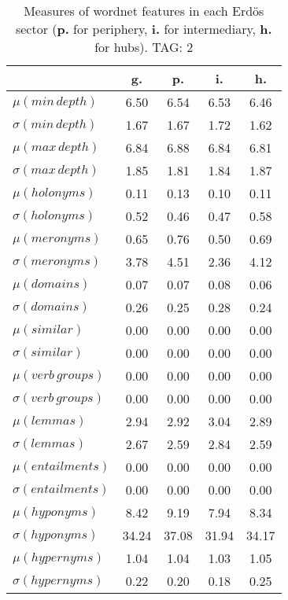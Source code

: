 \begin{table}[h!]
\begin{center}
\begin{tabular}{| l || c | c | c | c |}\hline
 & {\bf g.} & {\bf p.} & {\bf i.} & {\bf h.} \\\hline\hline
$\mu(min\,depth)$ & 6.50  & 6.54  & 6.53  & 6.46 \\
$\sigma(min\,depth)$ & 1.67  & 1.67  & 1.72  & 1.62 \\\hline
$\mu(max\,depth)$ & 6.84  & 6.88  & 6.84  & 6.81 \\
$\sigma(max\,depth)$ & 1.85  & 1.81  & 1.84  & 1.87 \\\hline
$\mu(holonyms)$ & 0.11  & 0.13  & 0.10  & 0.11 \\
$\sigma(holonyms)$ & 0.52  & 0.46  & 0.47  & 0.58 \\\hline
$\mu(meronyms)$ & 0.65  & 0.76  & 0.50  & 0.69 \\
$\sigma(meronyms)$ & 3.78  & 4.51  & 2.36  & 4.12 \\\hline
$\mu(domains)$ & 0.07  & 0.07  & 0.08  & 0.06 \\
$\sigma(domains)$ & 0.26  & 0.25  & 0.28  & 0.24 \\\hline
$\mu(similar)$ & 0.00  & 0.00  & 0.00  & 0.00 \\
$\sigma(similar)$ & 0.00  & 0.00  & 0.00  & 0.00 \\\hline
$\mu(verb\,groups)$ & 0.00  & 0.00  & 0.00  & 0.00 \\
$\sigma(verb\,groups)$ & 0.00  & 0.00  & 0.00  & 0.00 \\\hline
$\mu(lemmas)$ & 2.94  & 2.92  & 3.04  & 2.89 \\
$\sigma(lemmas)$ & 2.67  & 2.59  & 2.84  & 2.59 \\\hline
$\mu(entailments)$ & 0.00  & 0.00  & 0.00  & 0.00 \\
$\sigma(entailments)$ & 0.00  & 0.00  & 0.00  & 0.00 \\\hline
$\mu(hyponyms)$ & 8.42  & 9.19  & 7.94  & 8.34 \\
$\sigma(hyponyms)$ & 34.24  & 37.08  & 31.94  & 34.17 \\\hline
$\mu(hypernyms)$ & 1.04  & 1.04  & 1.03  & 1.05 \\
$\sigma(hypernyms)$ & 0.22  & 0.20  & 0.18  & 0.25 \\\hline
\end{tabular}
\caption{Measures of wordnet features in each Erd\"os sector ({{\bf p.}} for periphery, {{\bf i.}} for intermediary, {{\bf h.}} for hubs). TAG: 2}
\end{center}
\end{table}